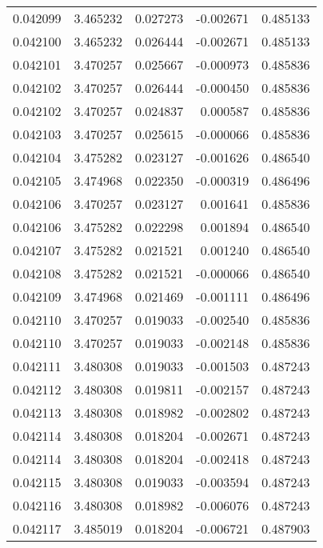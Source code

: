 \begin{tabular}{lrrrr}
0.042099    &  3.465232 &  0.027273 & -0.002671 &             0.485133 \\
0.042100    &  3.465232 &  0.026444 & -0.002671 &             0.485133 \\
0.042101    &  3.470257 &  0.025667 & -0.000973 &             0.485836 \\
0.042102    &  3.470257 &  0.026444 & -0.000450 &             0.485836 \\
0.042102    &  3.470257 &  0.024837 &  0.000587 &             0.485836 \\
0.042103    &  3.470257 &  0.025615 & -0.000066 &             0.485836 \\
0.042104    &  3.475282 &  0.023127 & -0.001626 &             0.486540 \\
0.042105    &  3.474968 &  0.022350 & -0.000319 &             0.486496 \\
0.042106    &  3.470257 &  0.023127 &  0.001641 &             0.485836 \\
0.042106    &  3.475282 &  0.022298 &  0.001894 &             0.486540 \\
0.042107    &  3.475282 &  0.021521 &  0.001240 &             0.486540 \\
0.042108    &  3.475282 &  0.021521 & -0.000066 &             0.486540 \\
0.042109    &  3.474968 &  0.021469 & -0.001111 &             0.486496 \\
0.042110    &  3.470257 &  0.019033 & -0.002540 &             0.485836 \\
0.042110    &  3.470257 &  0.019033 & -0.002148 &             0.485836 \\
0.042111    &  3.480308 &  0.019033 & -0.001503 &             0.487243 \\
0.042112    &  3.480308 &  0.019811 & -0.002157 &             0.487243 \\
0.042113    &  3.480308 &  0.018982 & -0.002802 &             0.487243 \\
0.042114    &  3.480308 &  0.018204 & -0.002671 &             0.487243 \\
0.042114    &  3.480308 &  0.018204 & -0.002418 &             0.487243 \\
0.042115    &  3.480308 &  0.019033 & -0.003594 &             0.487243 \\
0.042116    &  3.480308 &  0.018982 & -0.006076 &             0.487243 \\
0.042117    &  3.485019 &  0.018204 & -0.006721 &             0.487903 \\

\end{tabular}
